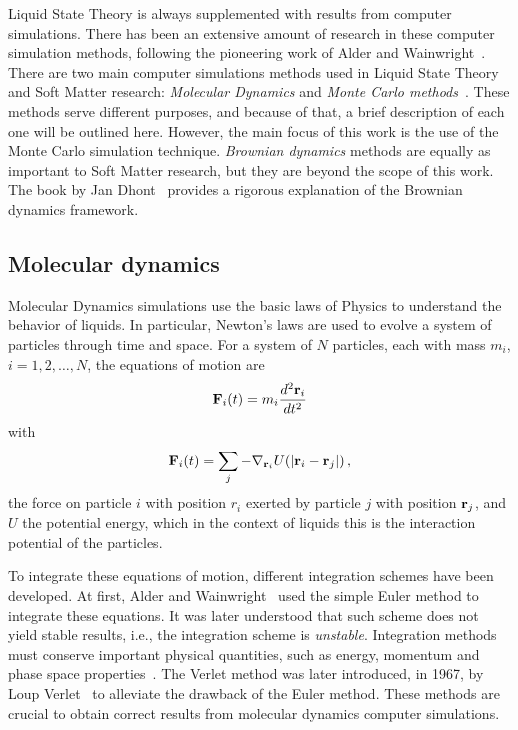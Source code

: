 Liquid State Theory is always supplemented with results from computer simulations.
There has been an extensive amount of research in these computer simulation methods,
following the pioneering work of Alder and Wainwright~\cite{alderPhaseTransitionHard1957a}.
There are two main computer simulations methods used in Liquid State Theory and
Soft Matter research: \emph{Molecular Dynamics} and \emph{Monte Carlo methods}~\cite{allenComputerSimulationLiquids2017,frenkelUnderstandingMolecularSimulation2001}.
These methods serve different purposes, and because of that, a brief description of each
one will be outlined here. However, the main focus of this work is the use of
the Monte Carlo simulation technique. \emph{Brownian dynamics} methods are
equally as important to Soft Matter research, but they are beyond the scope of this work.
The book by Jan Dhont~\cite{dhontIntroductionDynamicsColloids1996} provides a rigorous
explanation of the Brownian dynamics framework.

\subsection{Molecular dynamics}
Molecular Dynamics simulations use the basic laws of Physics to understand the behavior
of liquids. In particular, Newton's laws are used to evolve a system of particles through
time and space. For a system of $N$ particles, each with mass $m_i$, $i=1,2,\dots,N$,
the equations of motion are
\begin{equation}
    \mathbf{F}_i (t) = m_i \frac{d^2 \mathbf{r}_i}{dt^2}
    \label{eq:newton}
\end{equation}
with
\begin{equation}
    \mathbf{F}_i (t) = \sum_{j} - \nabla_{\mathbf{r}_i} U(\lvert \mathbf{r}_i - \mathbf{r}_j \rvert)
    \, ,
    \label{eq:newton-potential}
\end{equation}
the force on particle $i$ with position $r_i$ exerted by particle $j$ with position
$\mathbf{r}_j$, and $U$ the potential energy, which in the context of liquids this is the
interaction potential of the particles.

To integrate these equations of motion, different integration schemes have been developed.
At first, Alder and Wainwright~\cite{alderPhaseTransitionHard1957a} used the simple
Euler method to integrate these equations. It was later understood that such scheme
does not yield stable results, i.e., the integration scheme is \emph{unstable}.
Integration methods must conserve important physical quantities, such as energy,
momentum and phase space properties~\cite{razafindralandyReviewGeometricIntegrators2018}.
The Verlet method was later introduced, in 1967, by Loup Verlet~\cite{verletComputerExperimentsClassical1967a}
to alleviate the drawback of the Euler method. These methods are crucial to obtain
correct results from molecular dynamics computer simulations.


